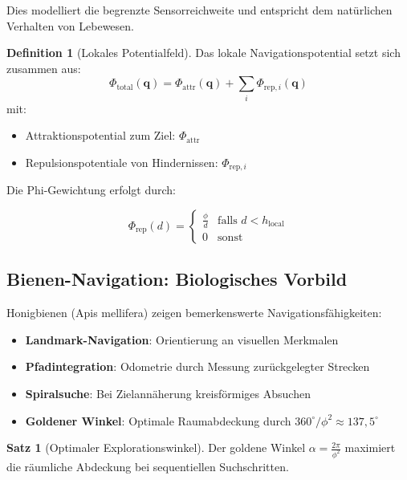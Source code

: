﻿\documentclass[a4paper,12pt]{article}
\theoremstyle{definition}
\newtheorem{definition}{Definition}
\newtheorem{satz}{Satz}
\begin{document}
Dies modelliert die begrenzte Sensorreichweite und entspricht dem natürlichen Verhalten von Lebewesen.

\begin{definition}[Lokales Potentialfeld]
	Das lokale Navigationspotential setzt sich zusammen aus:
	\begin{equation}
		\Phi_{\text{total}}(\mathbf{q}) = \Phi_{\text{attr}}(\mathbf{q}) + \sum_i \Phi_{\text{rep},i}(\mathbf{q})
	\end{equation}
	mit:
	\begin{itemize}
		\item[-] Attraktionspotential zum Ziel: $\Phi_{\text{attr}}$
		\item[-] Repulsionspotentiale von Hindernissen: $\Phi_{\text{rep},i}$
	\end{itemize}
\end{definition}

Die Phi-Gewichtung erfolgt durch:

\begin{equation}
\Phi_{\text{rep}}(d) = \begin{cases}
\frac{\phi}{d} & \text{falls } d < h_{\text{local}} \\
0 & \text{sonst}
\end{cases}
\end{equation}

\subsection{Bienen-Navigation: Biologisches Vorbild}

Honigbienen (Apis mellifera) zeigen bemerkenswerte Navigationsfähigkeiten:

\begin{itemize}
	\item[-] \textbf{Landmark-Navigation}: Orientierung an visuellen Merkmalen
	\item[-] \textbf{Pfadintegration}: Odometrie durch Messung zurückgelegter Strecken
	\item[-] \textbf{Spiralsuche}: Bei Zielannäherung kreisförmiges Absuchen
	\item[-] \textbf{Goldener Winkel}: Optimale Raumabdeckung durch $360^\circ/\phi^2 \approx 137{,}5^\circ$
\end{itemize}

\begin{satz}[Optimaler Explorationswinkel]
	Der goldene Winkel $\alpha = \frac{2\pi}{\phi^2}$ maximiert die räumliche Abdeckung bei sequentiellen Suchschritten.
\end{satz}
\end{document}
